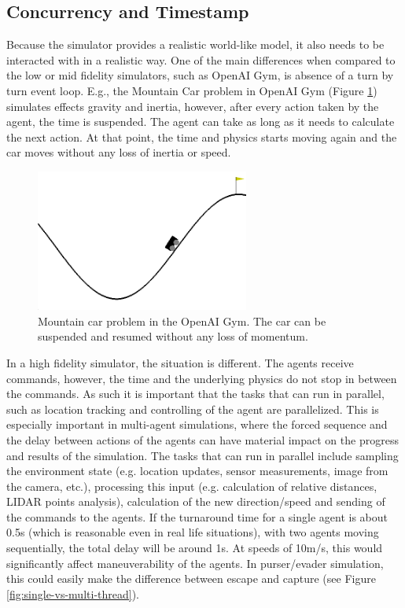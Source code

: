 \documentclass{article}
\begin{document}
\subsection{Concurrency and Timestamp} 
Because the simulator provides a realistic world-like model, it also needs to be interacted with in a realistic way. One of the main differences when compared to the low or mid fidelity simulators, such as OpenAI Gym, is absence of a turn by turn event loop.
E.g., the Mountain Car problem in OpenAI Gym (Figure \ref{fig:mountain-car}) simulates effects gravity and inertia, however, after every action taken by the agent, the time is suspended. The agent can take as long as it needs to calculate the next action. At that point, the time and physics starts moving again and the car moves without any loss of inertia or speed.
\begin{figure}
	\centering
	\includegraphics[width=7cm]{mountain-car}
	\caption{Mountain car problem in the OpenAI Gym. The car can be suspended and resumed without any loss of momentum.}\label{fig:mountain-car}
\end{figure}

In a high fidelity simulator, the situation is different. The agents receive commands, however, the time and the underlying physics do not stop in between the commands. As such it is important that the tasks that can run in parallel, such as location tracking and controlling of the agent are parallelized. This is especially important in multi-agent simulations, where the forced sequence and the delay between actions of the agents can have material impact on the progress and results of the simulation. The tasks that can run in parallel include sampling the environment state (e.g. location updates, sensor measurements, image from the camera, etc.), processing this input (e.g. calculation of relative distances, LIDAR points analysis), calculation of the new direction/speed and sending of the commands to the agents. If the turnaround time for a single agent is about 0.5s (which is reasonable even in real life situations), with two agents moving sequentially, the total delay will be around 1s. At speeds of 10m/s, this would significantly affect maneuverability of the agents. In purser/evader simulation, this could easily make the difference between escape and capture (see Figure \ref{fig:single-vs-multi-thread}).
\end{document}
